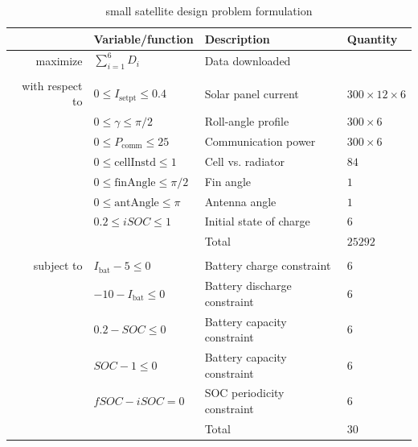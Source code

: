 \documentclass[]{aiaa-tc} %
\begin{document}
    \begin{table}
        \centering
        \begin{tabular}{r l l l}
            \hline
            & Variable/function & Description & Quantity \\
            \hline
            maximize            & $\sum_{i=1}^6 D_i$ & Data downloaded \\
            \\
            with respect to & $0 \le I_\text{setpt} \le 0.4$ & Solar panel current & $300 \times 12 \times 6$ \\
                                    & $0 \le \gamma \le \pi / 2$ & Roll-angle profile & $300 \times 6$ \\
                                    & $0 \le P_\text{comm} \le 25$ & Communication power & $300 \times 6$ \\
                                    & $0 \le \text{cellInstd} \le 1$ & Cell vs. radiator & $84$ \\
                                    & $0 \le \text{finAngle} \le \pi / 2$ & Fin angle & $1$ \\
                                    & $0 \le \text{antAngle} \le \pi$ & Antenna angle & $1$ \\
                                    & $0.2 \le iSOC \le 1$ & Initial state of charge & $6$ \\
                                    & & Total & $25292$ \\
            \\
            subject to          & $I_\text{bat} - 5 \le 0$ & Battery charge constraint & $6$ \\
                                    & $-10 - I_\text{bat} \le 0$ & Battery discharge constraint & $6$ \\
                                    & $0.2 - SOC \le 0$ & Battery capacity constraint & $6$ \\
                                    & $SOC - 1 \le 0$ & Battery capacity constraint & $6$ \\    
                                    & $fSOC - iSOC = 0$ & SOC periodicity constraint & $6$ \\   
                                    & & Total & $30$ \\     
            \hline                  
        \end{tabular}
        \caption{small satellite design problem formulation}
        \label{eqn:cadre_formulation}
    \end{table}
\end{document}
